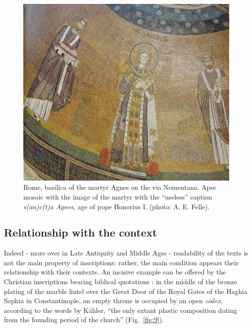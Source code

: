 \documentclass[amsthm,ebook]{saparticle}
\begin{document}
\begin{figure}[!hbp]
\centering
 \includegraphics[width=\columnwidth]{FelleVisualFeaturesofinscriptionsEAGLE2016FullPaper-img011.jpg}
\caption{Rome, basilica of the martyr Agnes on the via Nomentana. Apse mosaic with the image of the martyr with the
``useless'' caption  \emph{s(an)c(t)a Agnes}, age of pope Honorius I. (photo: A. E. Felle).}
\label{fig:8}
\end{figure}













\subsection{Relationship with the context}

\noindent Indeed - more over in Late Antiquity and Middle Ages - readability of the texts is not the main property of
inscriptions: rather, the main condition appears their relationship with their contexts. An incisive example can be
offered by the Christian inscriptions bearing biblical quotations \citep{felle_biblia_2006}: in the middle of the bronze
plating of the marble lintel over the Great Door of the Royal Gates of the Haghia Sophia in Constantinople, an empty
throne is occupied by an open \emph{codex}, according to the words by Kähler, ``the only extant plastic
composition dating from the founding period of the church'' \citep[29-30; 32][taff. 22; 62]{kahler_hagia_1967}
(Fig.~\ref{fig:9}).
\end{document}
